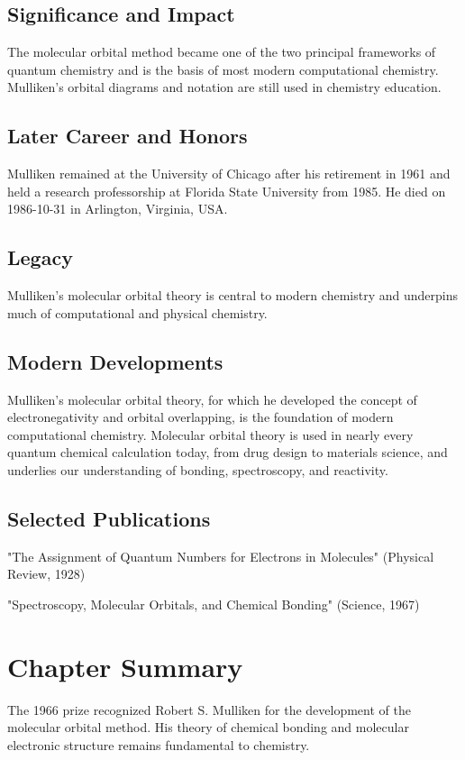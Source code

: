 \subsection*{Significance and Impact}

The molecular orbital method became one of the two principal frameworks of quantum chemistry and is the basis of most modern computational chemistry. Mulliken's orbital diagrams and notation are still used in chemistry education.

\subsection*{Later Career and Honors}

Mulliken remained at the University of Chicago after his retirement in 1961 and held a research professorship at Florida State University from 1985. He died on 1986-10-31 in Arlington, Virginia, USA.

\subsection*{Legacy}

Mulliken's molecular orbital theory is central to modern chemistry and underpins much of computational and physical chemistry.

\subsection*{Modern Developments}

Mulliken's molecular orbital theory, for which he developed the concept of electronegativity and orbital overlapping, is the foundation of modern computational chemistry. Molecular orbital theory is used in nearly every quantum chemical calculation today, from drug design to materials science, and underlies our understanding of bonding, spectroscopy, and reactivity.

\subsection*{Selected Publications}

"The Assignment of Quantum Numbers for Electrons in Molecules" (Physical Review, 1928)

"Spectroscopy, Molecular Orbitals, and Chemical Bonding" (Science, 1967)

\clearpage

\section*{Chapter Summary}

The 1966 prize recognized Robert S. Mulliken for the development of the molecular orbital method. His theory of chemical bonding and molecular electronic structure remains fundamental to chemistry.

